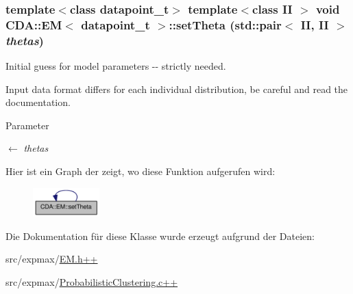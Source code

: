 \hypertarget{classCDA_1_1EM_a9e02e070fa25ab5bd9c2badbbd157f13}{
\subsubsection[{setTheta}]{\setlength{\rightskip}{0pt plus 5cm}template$<$class datapoint\_\-t$>$ template$<$class II $>$ void {\bf CDA::EM}$<$ datapoint\_\-t $>$::setTheta (std::pair$<$ II, II $>$ {\em thetas})}}
\label{classCDA_1_1EM_a9e02e070fa25ab5bd9c2badbbd157f13}


Initial guess for model parameters -\/-\/ strictly needed. 

Input data format differs for each individual distribution, be careful and read the documentation.


\begin{DoxyParams}{Parameter}
\item[\mbox{$\leftarrow$} {\em thetas}]\end{DoxyParams}


Hier ist ein Graph der zeigt, wo diese Funktion aufgerufen wird:\nopagebreak
\begin{figure}[H]
\begin{center}
\leavevmode
\includegraphics[width=73pt]{classCDA_1_1EM_a9e02e070fa25ab5bd9c2badbbd157f13_icgraph}
\end{center}
\end{figure}




Die Dokumentation für diese Klasse wurde erzeugt aufgrund der Dateien:\begin{DoxyCompactItemize}
\item 
src/expmax/\hyperlink{EM_8h_09_09}{EM.h++}\item 
src/expmax/\hyperlink{ProbabilisticClustering_8c_09_09}{ProbabilisticClustering.c++}\end{DoxyCompactItemize}
